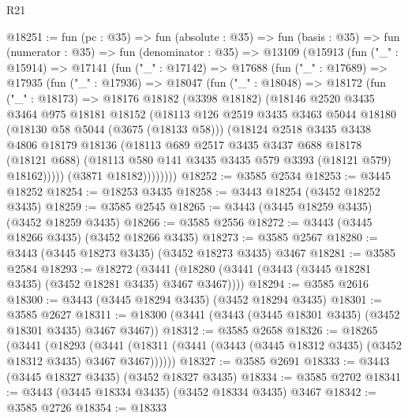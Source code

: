 \begin{lexlean}{R21}
\begin{coremodule}
@18251 := fun (pc : @35) =>
  fun (absolute : @35) =>
  fun (basis : @35) =>
  fun (numerator : @35) =>
  fun (denominator : @35) =>
  @13109
    (@15913
      (fun ("_" : @15914) =>
      @17141
        (fun ("_" : @17142) =>
        @17688
          (fun ("_" : @17689) =>
          @17935
            (fun ("_" : @17936) =>
            @18047
              (fun ("_" : @18048) =>
              @18172
                (fun ("_" : @18173) =>
                @18176
                  @18182
                  (@3398 @18182)
                  (@18146
                    @2520
                    @3435
                    @3464
                    @975
                    @18181
                    @18152
                    (@18113
                      @126
                      @2519
                      @3435
                      @3463
                      @5044
                      @18180
                      (@18130 @58 @5044 (@3675 (@18133 @58)))
                      (@18124
                        @2518
                        @3435
                        @3438
                        @4806
                        @18179
                        @18136
                        (@18113
                          @689
                          @2517
                          @3435
                          @3437
                          @688
                          @18178
                          (@18121 @688)
                          (@18113 @580 @141 @3435 @3435 @579 @3393 (@18121 @579) @18162)))))
                  (@3871 @18182))))))))
@18252 := @3585 @2534
@18253 := @3445 @18252
@18254 := @18253 @3435
@18258 := @3443 @18254 (@3452 @18252 @3435)
@18259 := @3585 @2545
@18265 := @3443 (@3445 @18259 @3435) (@3452 @18259 @3435)
@18266 := @3585 @2556
@18272 := @3443 (@3445 @18266 @3435) (@3452 @18266 @3435)
@18273 := @3585 @2567
@18280 := @3443 (@3445 @18273 @3435) (@3452 @18273 @3435) @3467
@18281 := @3585 @2584
@18293 := @18272
    (@3441 (@18280 (@3441 (@3443 (@3445 @18281 @3435) (@3452 @18281 @3435) @3467 @3467))))
@18294 := @3585 @2616
@18300 := @3443 (@3445 @18294 @3435) (@3452 @18294 @3435)
@18301 := @3585 @2627
@18311 := @18300 (@3441 (@3443 (@3445 @18301 @3435) (@3452 @18301 @3435) @3467 @3467))
@18312 := @3585 @2658
@18326 := @18265
    (@3441
      (@18293
        (@3441 (@18311 (@3441 (@3443 (@3445 @18312 @3435) (@3452 @18312 @3435) @3467 @3467))))))
@18327 := @3585 @2691
@18333 := @3443 (@3445 @18327 @3435) (@3452 @18327 @3435)
@18334 := @3585 @2702
@18341 := @3443 (@3445 @18334 @3435) (@3452 @18334 @3435) @3467
@18342 := @3585 @2726
@18354 := @18333

\end{coremodule}
\end{lexlean}
